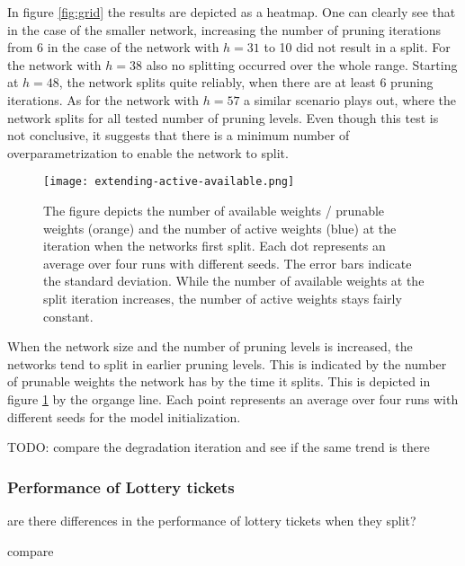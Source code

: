 In figure \ref{fig:grid} the results are depicted as a heatmap. 
One can clearly see that in the case of the smaller network, increasing the number of pruning iterations from 6 in the case of the network with $h=31$ to 10 did not result in a split.
For the network with $h=38$ also no splitting occurred over the whole range.
Starting at $h=48$, the network splits quite reliably, when there are at least 6 pruning iterations.
As for the network with $h=57$ a similar scenario plays out, where the network splits for all tested number of pruning levels.
Even though this test is not conclusive, it suggests that there is a minimum number of overparametrization to enable the network to split.

\begin{figure}[ht]
    \centering
    \texttt{[image: extending-active-available.png]}
    \caption{
        The figure depicts the number of available weights / prunable weights (orange) and the number of active weights (blue) at the iteration when the networks first split.
        Each dot represents an average over four runs with different seeds.
        The error bars indicate the standard deviation.
        While the number of available weights at the split iteration increases, the number of active weights stays fairly constant.
    }
    \label{fig:constant-active}
\end{figure}
When the network size and the number of pruning levels is increased, the networks tend to split in earlier pruning levels.
This is indicated by the number of prunable weights the network has by the time it splits.
This is depicted in figure \ref{fig:constant-active} by the organge line. 
Each point represents an average over four runs with different seeds for the model initialization. 

TODO: compare the degradation iteration and see if the same trend is there

\subsubsection{Performance of Lottery tickets}
are there differences in the performance of lottery tickets when they split?

compare 